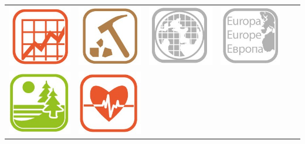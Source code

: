 \begin{frame}
\begin{center}
\begin{center}
\begin{tabular}{c c c c c c}
\includegraphics[scale=0.2]{obrazky/INSPIRE_Temata/SU.jpg} & \includegraphics[scale=0.2]{obrazky/INSPIRE_Temata/GE.jpg} & \includegraphics[scale=0.2]{obrazky/INSPIRE_Temata/GGS.jpg} & \includegraphics[scale=0.2]{obrazky/INSPIRE_Temata/GN.jpg}\\
\includegraphics[scale=0.2]{obrazky/INSPIRE_Temata/HB.jpg} & \includegraphics[scale=0.2]{obrazky/INSPIRE_Temata/HH.jpg} &

\end{tabular}
\end{center}
\end{center}
\end{frame}
